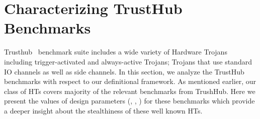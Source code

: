 \documentclass[10pt,journal,compsoc]{IEEEtran}
\begin{document}
 \section{Characterizing TrustHub Benchmarks}\label{sec:evaluation}

Trusthub~\cite{trust_hub} benchmark suite includes a wide variety of Hardware Trojans including trigger-activated and always-active Trojans; Trojans that use standard IO channels as well as side channels.
In this section, we analyze the TrustHub benchmarks with respect to our definitional framework.
As mentioned earlier, our  class of HTs covers majority of the relevant benchmarks from TrushHub. 
Here we present the values of design parameters (, , ) for these benchmarks which provide a deeper insight about the stealthiness of these well known HTs.
\end{document}
